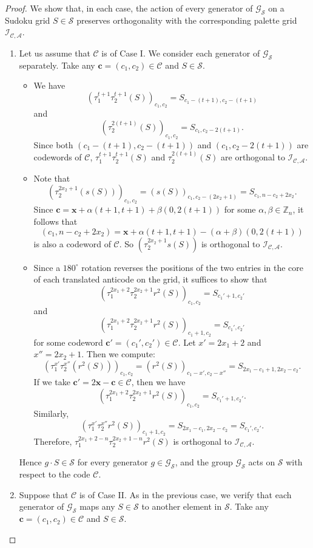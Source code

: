 \documentclass[10pt,a4paper]{amsart}
\begin{document}
\begin{proof}
We show that, in each case, the action of every generator of $\mathcal{G}_\mathcal{S}$ on a Sudoku grid $S \in \mathcal{S}$ preserves orthogonality with the corresponding palette grid $\mathcal{I}_{\mathcal{C}, \mathcal{A}}$.
\begin{enumerate}
\item[(i)] Let us assume that $\mathcal{C}$ is of Case I. We consider each generator of $\mathcal{G}_\mathcal{S}$ separately. Take any $\mathbf{c}=(c_1, c_2)\in\mathcal{C}$ and $S\in\mathcal{S}$.
	\begin{itemize}
	\item[(1)] We have
		\[
		(\tau_1^{t+1}\tau_2^{t+1}(S))_{c_1, c_2}=S_{c_1-(t+1), c_2-(t+1)}
		\]
		and
		\[
		(\tau_2^{2(t+1)}(S))_{c_1, c_2}=S_{c_1, c_2-2(t+1)}.
		\]
		Since both $(c_1-(t+1), c_2-(t+1))$ and $(c_1, c_2-2(t+1))$ are codewords of $\mathcal{C}$, $\tau_1^{t+1}\tau_2^{t+1}(S)$ and $\tau_2^{2(t+1)}(S)$ are orthogonal to $\mathcal{I}_{\mathcal{C}, \mathcal{A}}$.
	\item[(2)] Note that
		\[
		(\tau_2^{2x_2+1}(s(S)))_{c_1, c_2}=(s(S))_{c_1, c_2-(2x_2+1)}=S_{c_1, n-c_2+2x_2}.
		\]
		Since $\mathbf{c}=\mathbf{x}+\alpha(t+1, t+1)+\beta(0, 2(t+1))$ for some $\alpha, \beta\in\mathbb{Z}_n$, it follows that
		\[
		(c_1, n-c_2+2x_2)=\mathbf{x}+\alpha(t+1, t+1)-(\alpha+\beta)(0, 2(t+1))
		\]
		is also a codeword of $\mathcal{C}$. So $(\tau_2^{2x_2+1}s(S))$ is orthogonal to $\mathcal{I}_{\mathcal{C}, \mathcal{A}}$.
	\item[(3)] Since a $180^\circ$ rotation reverses the positions of the two entries in the core of each translated anticode on the grid, it suffices to show that
		\[
		(\tau_1^{2x_1+2}\tau_2^{2x_2+1} r^2(S))_{c_1, c_2} = S_{c_1'+1, c_2'}
		\]
		and
		\[
		(\tau_1^{2x_1+2}\tau_2^{2x_2+1} r^2(S))_{c_1+1, c_2} = S_{c_1', c_2'}
		\]
		for some codeword $\mathbf{c}' = (c_1', c_2') \in \mathcal{C}$. Let $x'=2x_1+2$ and $x''=2x_2+1$. Then we compute:
		\[
			(\tau_1^{x'}\tau_2^{x''} (r^2(S)))_{c_1, c_2}=(r^2(S))_{c_1-x', c_2-x''}=S_{2x_1-c_1+1, 2x_2-c_2}.
		\]
		If we take $\mathbf{c}'=2\mathbf{x}-\mathbf{c}\in\mathcal{C}$, then we have
		\[
		(\tau_1^{2x_1+2}\tau_2^{2x_2+1} r^2(S))_{c_1, c_2} = S_{c_1'+1, c_2'}.
		\]
		Similarly,
		\[
			(\tau_1^{x'}\tau_2^{x''} r^2(S))_{c_1+1, c_2}=S_{2x_1-c_1, 2x_2-c_2}=S_{c_1', c_2'}.
		\]
		Therefore, $\tau_1^{2x_1+2-n} \tau_2^{2x_2+1-n} r^2(S)$ is orthogonal to $\mathcal{I}_{\mathcal{C}, \mathcal{A}}$.
	\end{itemize}
	Hence $g \cdot S \in \mathcal{S}$ for every generator $g \in \mathcal{G}_\mathcal{S}$, and the group $\mathcal{G}_\mathcal{S}$ acts on $\mathcal{S}$ with respect to the code $\mathcal{C}$.
\item[(ii)] Suppose that $\mathcal{C}$ is of Case II. As in the previous case, we verify that each generator of $\mathcal{G}_\mathcal{S}$ maps any $S \in \mathcal{S}$ to another element in $\mathcal{S}$. Take any $\mathbf{c} = (c_1, c_2) \in \mathcal{C}$ and $S \in \mathcal{S}$.


\end{enumerate}
\end{proof}
\end{document}
